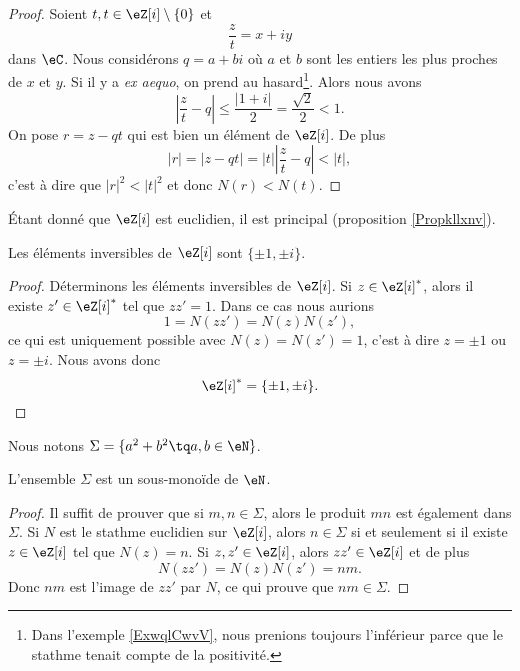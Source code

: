 \begin{proof}
    Soient \( t,t\in \eZ[i]\setminus\{ 0 \}\) et 
    \begin{equation}
        \frac{ z }{ t }=x+iy
    \end{equation}
    dans \( \eC\). Nous considérons \( q=a+bi\) où \( a\) et \( b\) sont les entiers les plus proches de \( x\) et \( y\). Si il y a \emph{ex aequo}, on prend au hasard\footnote{Dans l'exemple \ref{ExwqlCwvV}, nous prenions toujours l'inférieur parce que le stathme tenait compte de la positivité.}. Alors nous avons
    \begin{equation}
        | \frac{ z }{ t }-q |\leq \frac{ | 1+i | }{ 2 }=\frac{ \sqrt{2} }{2}<1.
    \end{equation}
    On pose \( r=z-qt\) qui est bien un élément de \( \eZ[i]\). De plus
    \begin{equation}
        | r |=| z-qt |=| t | |\frac{ z }{ t }-q |<| t |,
    \end{equation}
    c'est à dire que \( | r |^2<| t |^2\) et donc \( N(r)<N(t)\). 
\end{proof}
Étant donné que \( \eZ[i]\) est euclidien, il est principal (proposition \ref{Propkllxnv}).

\begin{lemma}   \label{LemBMEIiiV}
    Les éléments inversibles de \( \eZ[i]\) sont \( \{ \pm 1,\pm i \}\).
\end{lemma}

\begin{proof}

    Déterminons les éléments inversibles de \( \eZ[i]\). Si \( z\in \eZ[i]^*\), alors il existe \( z'\in \eZ[i]^*\) tel que \( zz'=1\). Dans ce cas nous aurions
    \begin{equation}
        1=N(zz')=N(z)N(z'),
    \end{equation}
    ce qui est uniquement possible avec \( N(z)=N(z')=1\), c'est à dire \( z=\pm 1\) ou \( z=\pm i\). Nous avons donc
    \begin{equation}
        \eZ[i]^*=\{ \pm 1,\pm i \}.
    \end{equation}
\end{proof}

Nous notons \( \Sigma=\{ a^2+b^2\tq a,b\in \eN \}\). 
\begin{lemma}   \label{LemIBDPzMB}
    L'ensemble \( \Sigma\) est un sous-monoïde de \( \eN\).
\end{lemma}

\begin{proof}
    Il suffit de prouver que si \( m,n\in \Sigma\), alors le produit \( mn\) est également dans \( \Sigma\). Si \( N\) est le stathme euclidien sur \( \eZ[i]\), alors  \( n\in \Sigma\) si et seulement si il existe \( z\in \eZ[i]\) tel que \( N(z)=n\). Si \( z,z'\in \eZ[i]\), alors \( zz'\in \eZ[i]\) et de plus
    \begin{equation}
        N(zz')=N(z)N(z')=nm.
    \end{equation}
    Donc \( nm\) est l'image de \( zz'\) par \( N\), ce qui prouve que \( nm\in \Sigma\).
\end{proof}

